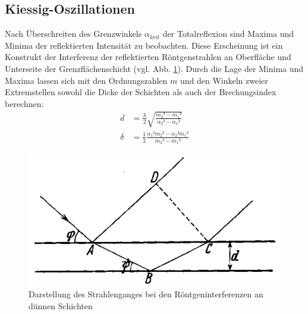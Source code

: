 \subsection{Kiessig-Oszillationen}
Nach Überschreiten des Grenzwinkels $\alpha_{krit}$ der Totalreflexion sind Maxima und Minima der reflektierten Intensität zu beobachten.
Diese Erscheinung ist ein Konstrukt der Interferenz der reflektierten Röntgenstrahlen an Oberfläche und Unterseite der Grenzflächenschicht (vgl. Abb. \ref{fig:kiessig}).
Durch die Lage der Minima und Maxima lassen sich mit den Ordnungszahlen $m$ und den Winkeln zweier Extremstellen sowohl die Dicke der Schichten als auch der Brechungsindex berechnen: \cite{kiessig}
\begin{align}
    d &= \frac{\lambda}{2}\sqrt{\frac{m_2²-m_1²}{\alpha_2²-\alpha_1²}} \\
    \delta &= \frac{1}{2}\frac{\alpha_1² m_2² - \alpha_2² m_1²}{m_2²-m_1²}
\end{align}

\begin{figure}
    \center
    \includegraphics[width=0.6\linewidth]{abb/kiessig.png}
    \caption{Darstellung des Strahlenganges bei den Röntgeninterferenzen an dünnen Schichten \cite{kiessig}}
    \label{fig:kiessig}
\end{figure}

